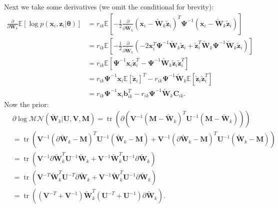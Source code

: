 \documentclass[a4paper,11pt]{article}
\DeclareMathOperator*{\tr}{tr}
\begin{document}
Next we take some derivatives (we omit the conditional for brevity):
\begin{align*}
    \frac\partial{ \partial \mathbf{W}_k } \mathbb{E}\left[
		\log p( \mathbf{x}_i, \mathbf{z}_i | \boldsymbol{\theta} )
	\right]
	&= r_{ik} \mathbb{E}\left[
        -\frac12 \frac\partial{ \partial \tilde{\mathbf{W}}_k }
        ( \mathbf{x}_i - \tilde{\mathbf{W}}_k \tilde{\mathbf{z}}_i )^T
        \boldsymbol\Psi^{-1}
        ( \mathbf{x}_i - \tilde{\mathbf{W}}_k \tilde{\mathbf{z}}_i )
    \right] \\
    &= r_{ik} \mathbb{E}\left[
        -\frac12 \frac\partial{ \partial \tilde{\mathbf{W}}_k } \left(
            -2 \mathbf{x}_i^T \boldsymbol{\Psi}^{-1} \tilde{\mathbf{W}}_k \tilde{\mathbf{z}}_i
            + \tilde{\mathbf{z}}_i^T \tilde{\mathbf{W}}_k \boldsymbol{\Psi}^{-1}
            \tilde{\mathbf{W}}_k \tilde{\mathbf{z}}_i
        \right)
    \right] \\
    &= r_{ik} \mathbb{E}\left[
		\boldsymbol{\Psi}^{-1} \mathbf{x}_i \tilde{\mathbf{z}}_i^T
		- \boldsymbol{\Psi}^{-1}
		\tilde{\mathbf{W}}_k \tilde{\mathbf{z}}_i \tilde{\mathbf{z}}_i^T
    \right] \\
    &= r_{ik} \boldsymbol{\Psi}^{-1} \mathbf{x}_i
        \mathbb{E}\left[ \tilde{\mathbf{z}}_i \right]^T
        - r_{ik} \boldsymbol{\Psi}^{-1} \tilde{\mathbf{W}}_k
        \mathbb{E}\left[ \tilde{\mathbf{z}}_i \tilde{\mathbf{z}}_i^T \right] \\ 
    &= r_{ik} \boldsymbol{\Psi}^{-1} \mathbf{x}_i
    \mathbf{b}_{ik}^T
    - r_{ik}\boldsymbol{\Psi}^{-1} \tilde{\mathbf{W}}_k
    \mathbf{C}_{ik}.
\end{align*}
Now the prior:
\begin{align*}
    &\partial \log \mathcal{MN}\left(
		\tilde{\mathbf{W}}_k
		| \mathbf{U}, \mathbf{V}, \mathbf{M}
	\right)
    = \tr\left(
        \partial\left(
            \mathbf{V}^{-1} ( \mathbf{M} - \tilde{\mathbf{W}}_k )^T \mathbf{U}^{-1}
            ( \mathbf{M} - \tilde{\mathbf{W}}_k )
        \right)
    \right) \\
    &= \tr\left(
        \mathbf{V}^{-1} ( \partial\tilde{\mathbf{W}}_k - \mathbf{M} )^T \mathbf{U}^{-1}
        ( \tilde{\mathbf{W}}_k - \mathbf{M} ) +
        \mathbf{V}^{-1} ( \partial\tilde{\mathbf{W}}_k - \mathbf{M} )^T \mathbf{U}^{-1}
        ( \tilde{\mathbf{W}}_k - \mathbf{M} )
    \right) \\
    &= \tr\left(
        \mathbf{V}^{-1} \partial\tilde{\mathbf{W}}_k^T \mathbf{U}^{-1}
        \tilde{\mathbf{W}}_k
		+ \mathbf{V}^{-1} \tilde{\mathbf{W}}_k^T \mathbf{U}^{-1}
        \partial\tilde{\mathbf{W}}_k
    \right) \\
    &= \tr\left(
        \mathbf{V}^{-T} \tilde{\mathbf{W}}_k^T \mathbf{U}^{-T}
        \partial\tilde{\mathbf{W}}_k
		+ \mathbf{V}^{-1} \tilde{\mathbf{W}}_k^T \mathbf{U}^{-1}
        \partial\tilde{\mathbf{W}}_k
    \right) \\
    &= \tr\left(
        \left(
            \mathbf{V}^{-T} + \mathbf{V}^{-1}
        \right) \tilde{\mathbf{W}}_k^T \left(
            \mathbf{U}^{-T} + \mathbf{U}^{-1}
        \right) \partial \tilde{\mathbf{W}}_k
    \right).
\end{align*}
\end{document}
